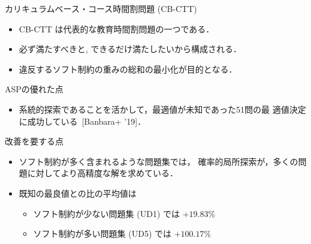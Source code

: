 \documentclass[11pt,dvipdfmx]{beamer}
\begin{document}
\begin{frame}{カリキュラムベース・コース時間割問題 (CB-CTT)}
  \begin{itemize}
  \item CB-CTT は代表的な教育時間割問題の一つである．
  \item 必ず満たすべきと, 
    できるだけ満たしたいから構成される．
  \item 違反するソフト制約の重みの総和の最小化が目的となる．
  \end{itemize}

  \begin{alertblock}{ASPの優れた点}
    \begin{itemize}
    \item 系統的探索であることを活かして，最適値が未知であった51問の最
      適値決定に成功している~[Banbara+ '19]．
  \end{itemize}    
  \end{alertblock}

  \begin{block}{改善を要する点}
    \begin{itemize}
    \item ソフト制約が多く含まれるような問題集では，
      確率的局所探索が，多くの問題に対してより高精度な解を求めている．
     \item 既知の最良値との比の平均値は
       \begin{itemize}
       \item ソフト制約が少ない問題集 (UD1) では $+19.83\%$
       \item ソフト制約が多い問題集 (UD5) では $+100.17\%$
       \end{itemize}
    \end{itemize}
  \end{block}
\end{frame}
\end{document}
